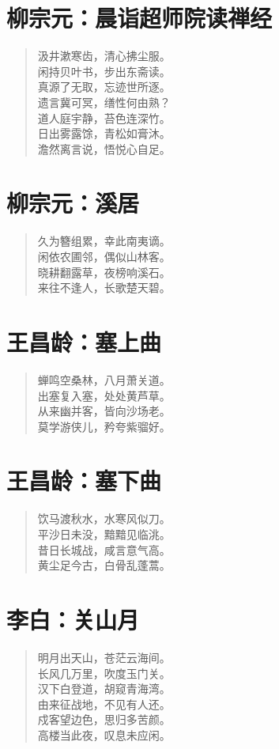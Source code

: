 \documentclass[12pt,oneside]{book}
\newenvironment{shici}{
\begin{verse}
\centering\large\hspace{12pt}}
{\end{verse}}
\begin{document}
\chapter{柳宗元：晨诣超师院读禅经}
\begin{shici}
汲井漱寒齿，清心拂尘服。\\
闲持贝叶书，步出东斋读。\\
真源了无取，忘迹世所逐。\\
遗言冀可冥，缮性何由熟？\\
道人庭宇静，苔色连深竹。\\
日出雾露馀，青松如膏沐。\\
澹然离言说，悟悦心自足。
\end{shici}

\chapter{柳宗元：溪居}
\begin{shici}
久为簪组累，幸此南夷谪。\\
闲依农圃邻，偶似山林客。\\
晓耕翻露草，夜榜响溪石。\\
来往不逢人，长歌楚天碧。
\end{shici}

\chapter{王昌龄：塞上曲}
\begin{shici}
蝉鸣空桑林，八月萧关道。\\
出塞复入塞，处处黄芦草。\\
从来幽并客，皆向沙场老。\\
莫学游侠儿，矜夸紫骝好。
\end{shici}


\chapter{王昌龄：塞下曲}
\begin{shici}
饮马渡秋水，水寒风似刀。\\
平沙日未没，黯黯见临洮。\\
昔日长城战，咸言意气高。\\
黄尘足今古，白骨乱蓬蒿。
\end{shici}

\chapter{李白：关山月}
\begin{shici}
明月出天山，苍茫云海间。\\
长风几万里，吹度玉门关。\\
汉下白登道，胡窥青海湾。\\
由来征战地，不见有人还。\\
戍客望边色，思归多苦颜。\\
高楼当此夜，叹息未应闲。
\end{shici}
\end{document}
